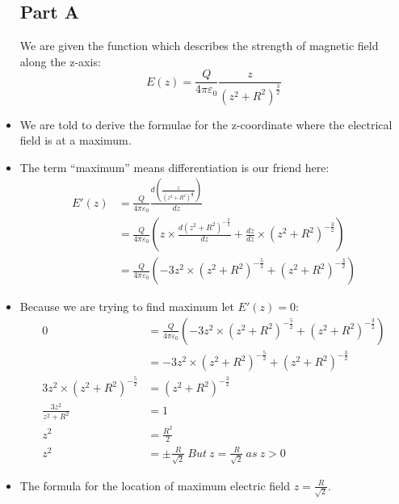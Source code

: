\documentclass[12pt]{article}
\begin{document}
\begin{itemize}
\subsection{Part A}
We are given the function which describes the strength of magnetic field along the z-axis:
\begin{displaymath}
E(z)=\frac{Q}{4 \pi \varepsilon_0}\frac{z}{(z^2+R^2)^{\frac{3}{2}}}
\end{displaymath}
\item We are told to derive the formulae for the z-coordinate where the electrical field is at a maximum.
\item The term ``maximum'' means differentiation is our friend here:
\setcounter{equation}{0}
\begin{align*}
E'(z)&=\frac{Q}{4 \pi \varepsilon_0} \frac{ d \left(\frac{z}{(z^2+R^2)^{\frac{3}{2}}} \right) }{dz} \\
&=\frac{Q}{4 \pi \varepsilon_0} \left(z \times  \frac{d(z^2+R^2)^{-\frac{3}{2}}}{dz} + \frac{dz}{dz} \times (z^2+R^2)^{-\frac{3}{2}}\right) \\
&=\frac{Q}{4 \pi \varepsilon_0} \left(- 3 z^2 \times (z^2+R^2)^{-\frac{5}{2}} + (z^2+R^2)^{-\frac{3}{2}}\right)
\end{align*}

\item Because we are trying to find maximum let $E'(z)=0$:
\begin{align*}
0&=\frac{Q}{4 \pi \varepsilon_0} \left(- 3 z^2 \times (z^2+R^2)^{-\frac{5}{2}} + (z^2+R^2)^{-\frac{3}{2}}\right) \\
&=- 3 z^2 \times (z^2+R^2)^{-\frac{5}{2}} + (z^2+R^2)^{-\frac{3}{2}} \\
3 z^2 \times (z^2+R^2)^{-\frac{5}{2}} &= (z^2+R^2)^{-\frac{3}{2}} \\
\frac{3 z^2}{ z^2+R^2} &= 1 \\
z^2 &= \frac{R^2}{2} \\
z^2 &= \pm\frac{R}{\sqrt{2}} \ But \ z= \frac{R}{\sqrt{2}} \ as \ z > 0
\end{align*}
\item The formula for the location of maximum electric field $z= \frac{R}{\sqrt{2}}$.
\pagebreak

\end{itemize}
\end{document}
